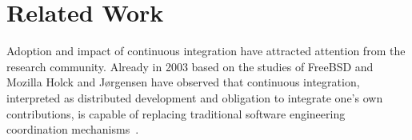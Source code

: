 \section{Related Work}
\label{sec:rw}
Adoption and impact of continuous integration have attracted  attention from the research community. Already in 2003 based on the studies of FreeBSD and Mozilla Holck and J{\o}rgensen have observed that continuous integration, interpreted as distributed development and obligation to integrate one's own contributions, is capable of replacing traditional software engineering coordination mechanisms~\cite{HolckJ03}.  

